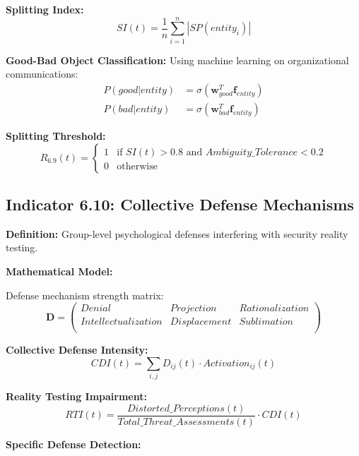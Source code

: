 \documentclass[11pt,a4paper]{article}
\begin{document}
\textbf{Splitting Index:}
\begin{equation}
SI(t) = \frac{1}{n}\sum_{i=1}^n |SP(entity_i)|
\end{equation}

\textbf{Good-Bad Object Classification:}
Using machine learning on organizational communications:
\begin{align}
P(good|entity) &= \sigma(\mathbf{w}_{good}^T \mathbf{f}_{entity}) \\
P(bad|entity) &= \sigma(\mathbf{w}_{bad}^T \mathbf{f}_{entity})
\end{align}

\textbf{Splitting Threshold:}
\begin{equation}
R_{6.9}(t) = \begin{cases}
1 & \text{if } SI(t) > 0.8 \text{ and } Ambiguity\_Tolerance < 0.2 \\
0 & \text{otherwise}
\end{cases}
\end{equation}

\subsection{Indicator 6.10: Collective Defense Mechanisms}

\textbf{Definition:} Group-level psychological defenses interfering with security reality testing.

\textbf{Mathematical Model:}

Defense mechanism strength matrix:
\begin{equation}
\mathbf{D} = \begin{pmatrix}
Denial & Projection & Rationalization \\
Intellectualization & Displacement & Sublimation \\
\end{pmatrix}
\end{equation}

\textbf{Collective Defense Intensity:}
\begin{equation}
CDI(t) = \sum_{i,j} D_{ij}(t) \cdot Activation_{ij}(t)
\end{equation}

\textbf{Reality Testing Impairment:}
\begin{equation}
RTI(t) = \frac{Distorted\_Perceptions(t)}{Total\_Threat\_Assessments(t)} \cdot CDI(t)
\end{equation}

\textbf{Specific Defense Detection:}
\end{document}
